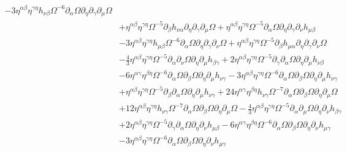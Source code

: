\documentclass[10pt,letterpaper]{article}
\begin{document}
\begin{align}
 - 3 \eta^{\alpha \beta} \eta^{\gamma \eta} h_{\nu \beta} \Omega^{-6} \partial_{\alpha}\Omega \partial_{\eta}\partial_{\gamma}\partial_{\mu}\Omega\nonumber\\
& + \eta^{\alpha \beta} \eta^{\gamma \eta} \Omega^{-5} \partial_{\beta}h_{\nu \alpha} \partial_{\eta}\partial_{\gamma}\partial_{\mu}\Omega
 + \eta^{\alpha \beta} \eta^{\gamma \eta} \Omega^{-5} \partial_{\alpha}\Omega \partial_{\eta}\partial_{\gamma}\partial_{\nu}h_{\mu \beta}\nonumber\\
& - 3 \eta^{\alpha \beta} \eta^{\gamma \eta} h_{\mu \beta} \Omega^{-6} \partial_{\alpha}\Omega \partial_{\eta}\partial_{\gamma}\partial_{\nu}\Omega
 + \eta^{\alpha \beta} \eta^{\gamma \eta} \Omega^{-5} \partial_{\beta}h_{\mu \alpha} \partial_{\eta}\partial_{\gamma}\partial_{\nu}\Omega\nonumber\\
& -  \tfrac{4}{3} \eta^{\alpha \beta} \eta^{\gamma \eta} \Omega^{-5} \partial_{\alpha}\partial_{\nu}\Omega \partial_{\eta}\partial_{\mu}h_{\beta \gamma}
 + 2 \eta^{\alpha \beta} \eta^{\gamma \eta} \Omega^{-5} \partial_{\gamma}\partial_{\alpha}\Omega \partial_{\eta}\partial_{\mu}h_{\nu \beta}\nonumber\\
& - 6 \eta^{\alpha \gamma} \eta^{\beta \eta} \Omega^{-6} \partial_{\alpha}\Omega \partial_{\beta}\Omega \partial_{\eta}\partial_{\mu}h_{\nu \gamma}
 - 3 \eta^{\alpha \beta} \eta^{\gamma \eta} \Omega^{-6} \partial_{\alpha}\Omega \partial_{\beta}\Omega \partial_{\eta}\partial_{\mu}h_{\nu \gamma}\nonumber\\
& + \eta^{\alpha \beta} \eta^{\gamma \eta} \Omega^{-5} \partial_{\beta}\partial_{\alpha}\Omega \partial_{\eta}\partial_{\mu}h_{\nu \gamma}
 + 24 \eta^{\alpha \gamma} \eta^{\beta \eta} h_{\nu \gamma} \Omega^{-7} \partial_{\alpha}\Omega \partial_{\beta}\Omega \partial_{\eta}\partial_{\mu}\Omega\nonumber\\
& + 12 \eta^{\alpha \beta} \eta^{\gamma \eta} h_{\nu \gamma} \Omega^{-7} \partial_{\alpha}\Omega \partial_{\beta}\Omega \partial_{\eta}\partial_{\mu}\Omega
 -  \tfrac{4}{3} \eta^{\alpha \beta} \eta^{\gamma \eta} \Omega^{-5} \partial_{\alpha}\partial_{\mu}\Omega \partial_{\eta}\partial_{\nu}h_{\beta \gamma}\nonumber\\
& + 2 \eta^{\alpha \beta} \eta^{\gamma \eta} \Omega^{-5} \partial_{\gamma}\partial_{\alpha}\Omega \partial_{\eta}\partial_{\nu}h_{\mu \beta}
 - 6 \eta^{\alpha \gamma} \eta^{\beta \eta} \Omega^{-6} \partial_{\alpha}\Omega \partial_{\beta}\Omega \partial_{\eta}\partial_{\nu}h_{\mu \gamma}\nonumber\\
& - 3 \eta^{\alpha \beta} \eta^{\gamma \eta} \Omega^{-6} \partial_{\alpha}\Omega \partial_{\beta}\Omega \partial_{\eta}\partial_{\nu}h_{\mu \gamma}

\end{align}
\end{document}
